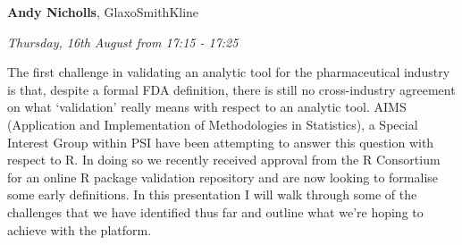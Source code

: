 \documentclass[]{book}
\theoremstyle{definition}
\theoremstyle{definition}
\theoremstyle{definition}
\theoremstyle{remark}
\begin{document}
\textbf{Andy Nicholls}, GlaxoSmithKline

\emph{Thursday, 16th August from 17:15 - 17:25}

The first challenge in validating an analytic tool for the
pharmaceutical industry is that, despite a formal FDA definition, there
is still no cross-industry agreement on what `validation' really means
with respect to an analytic tool. AIMS (Application and Implementation
of Methodologies in Statistics), a Special Interest Group within PSI
have been attempting to answer this question with respect to R. In doing
so we recently received approval from the R Consortium for an online R
package validation repository and are now looking to formalise some
early definitions. In this presentation I will walk through some of the
challenges that we have identified thus far and outline what we're
hoping to achieve with the platform.

\backmatter
\printindex
\end{document}
